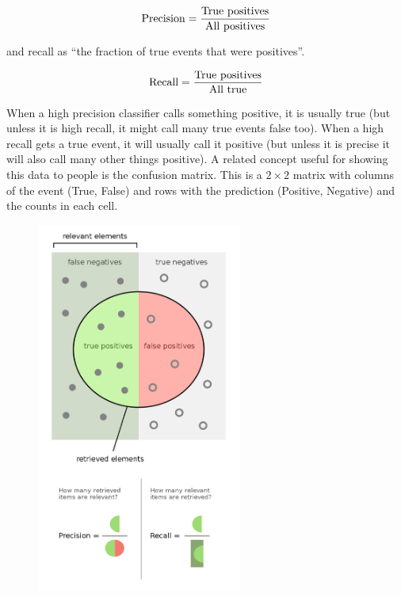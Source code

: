 \documentclass{article}
\begin{document}
\begin{equation}
    {\rm Precision} = \frac{\rm True\ positives}{\rm All\ positives}
\end{equation}

\noindent
and recall as ``the fraction of true events that were positives''.

\begin{equation}
    {\rm Recall} = \frac{\rm True\ positives}{\rm All\ true}
\end{equation}

When a high precision classifier calls something positive, it is usually true (but unless it is high recall, it might call many true events false too).
When a high recall gets a true event, it will usually call it positive (but unless it is precise it will also call many other things positive).
A related concept useful for showing this data to people is the confusion matrix. This is a $2 \times 2$ matrix with columns of the event (True, False) and rows with the prediction (Positive, Negative) and the counts in each cell.

\begin{figure}[h!]
    \centering
    \href{https://en.wikipedia.org/wiki/Precision_and_recall}{
        \includegraphics[width=0.6\textwidth]{./figures/PrecisionRecall.png}
    }
\end{figure}
\end{document}
